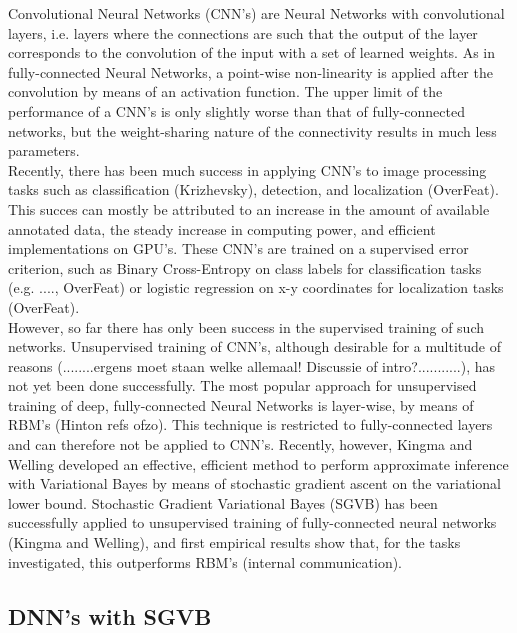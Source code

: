 Convolutional Neural Networks (CNN's) are Neural Networks with convolutional layers, i.e. layers where the connections are such that the output of the layer corresponds to the convolution of the input with a set of learned weights. As in fully-connected Neural Networks, a point-wise non-linearity is applied after the convolution by means of an activation function. The upper limit of the performance of a CNN's is only slightly worse than that of fully-connected networks, but the weight-sharing nature of the connectivity results in much less parameters. \\
Recently, there has been much success in applying CNN's to image processing tasks such as classification (Krizhevsky), detection, and localization (OverFeat). This succes can mostly be attributed to an increase in the amount of available annotated data, the steady increase in computing power, and efficient implementations on GPU's. These CNN's are trained on a supervised error criterion, such as Binary Cross-Entropy on class labels for classification tasks (e.g. ...., OverFeat) or logistic regression on x-y coordinates for localization tasks (OverFeat).\\
However, so far there has only been success in the supervised training of such networks. Unsupervised training of CNN's, although desirable for a multitude of reasons (........ergens moet staan welke allemaal! Discussie of intro?...........), has not yet been done successfully. The most popular approach for unsupervised training of deep, fully-connected Neural Networks is layer-wise, by means of RBM's (Hinton refs ofzo). This technique is restricted to fully-connected layers and can therefore not be applied to CNN's. Recently, however, Kingma and Welling developed an effective, efficient method to perform approximate inference with Variational Bayes by means of stochastic gradient ascent on the variational lower bound. Stochastic Gradient Variational Bayes (SGVB) has been successfully applied to unsupervised training of fully-connected neural networks (Kingma and Welling), and first empirical results show that, for the tasks investigated, this outperforms RBM's (internal communication). \\


\subsection{DNN's with SGVB}

